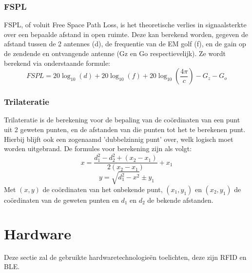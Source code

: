 \subsubsection{FSPL}
FSPL, of voluit Free Space Path Loss, is het theoretische verlies in signaalsterkte over een bepaalde afstand in open ruimte. Deze kan berekend worden, gegeven de afstand tussen de 2 antennes (d), de frequentie van de EM golf (f), en de gain op de zendende en ontvangende antenne (Gz en Go respectievelijk). Ze wordt berekend via onderstaande formule: 
\[FSPL = 20\log_{10}(d) + 20\log_{10}(f) + 20\log_{10}(\frac{4\pi}{c}) - G_z - G_o \]
\autocite{Pasternack2020}

\subsubsection{Trilateratie}
Trilateratie is de berekening voor de bepaling van de coördinaten van een punt uit 2 geweten punten, en de afstanden van die punten tot het te berekenen punt. Hierbij blijft ook een zogenaamd 'dubbelzinnig punt' over, welk logisch moet worden uitgebrand. De formules voor berekening zijn als volgt:
 \[x = \frac{d_1^2 - d_2^2 + (x_2 - x_1)}{2(x_2 - x_1)} + x_1\]
 \[y = \sqrt{d_1^2 - x^2} \pm y_1\]
 Met \((x,  y)\) de coördinaten van het onbekende punt,  \((x_1, y_1)\) en \((x_2, y_1)\) de coördinaten van de geweten punten en \(d_1\) en \(d_2\) de bekende afstanden.
 \autocite{TRM2022}

\section{Hardware}
\label{sec:Hardware}
Deze sectie zal de gebruikte hardwaretechnologieën toelichten, deze zijn RFID en BLE.

